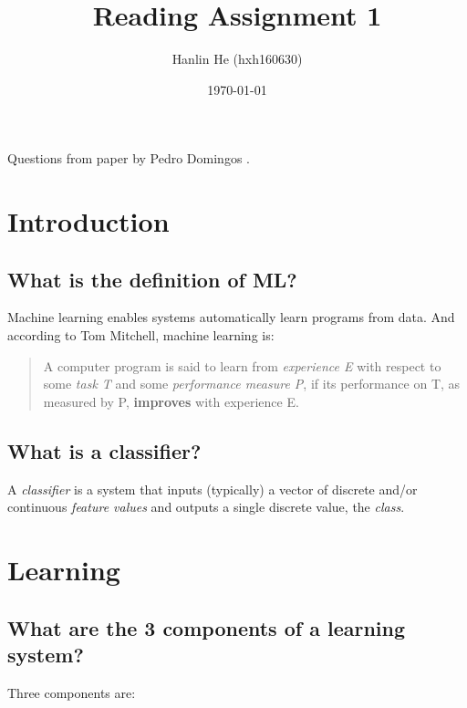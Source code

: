 \documentclass[12pt]{article}
\title{Reading Assignment 1}
\author{Hanlin He (hxh160630)}
\date{\today}
\begin{document}
\maketitle

Questions from paper by Pedro Domingos
\cite{Domingos:2012:FUT:2347736.2347755}.

\section{Introduction}

\subsection{What is the definition of ML?}

Machine learning enables systems automatically learn programs from data.
And according to Tom Mitchell, machine learning is:

\begin{quote}
    A computer program is said to learn from \emph{experience E} with respect
    to some \emph{task T} and some \emph{performance measure P}, if its
    performance on T, as measured by P, \textbf{improves} with experience E.
\end{quote}

\subsection{What is a classifier?}

A \emph{classifier} is a system that inputs (typically) a vector of discrete
and/or continuous \emph{feature values} and outputs a single discrete value,
the \emph{class}.

\section{Learning}

\subsection{What are the 3 components of a learning system?}

Three components are:
\end{document}
